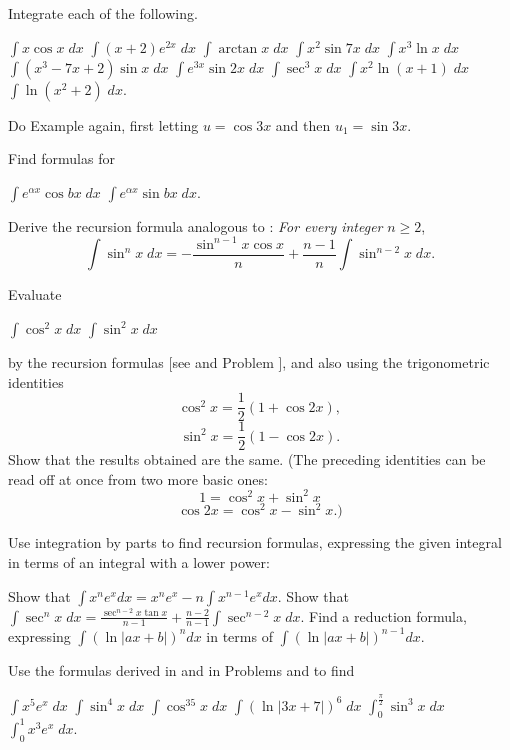 \begin{exercises}

Integrate each of the following.
\begin{exenum}
\x
$\int x \cos x \; dx$
\x
$\int (x+2) e^{2x} \; dx$
\x
$\int \arctan x \; dx$
\x
$\int x^2\sin 7x \; dx$
\x
$\int x^3 \ln x \; dx$
\x
$\int (x^3-7x+2) \sin x \; dx$
\x
$\int e^{3x} \sin 2x \; dx$
\x
$\int \sec^3x \; dx$
\x
$\int x^2\ln(x+1) \; dx$
\x
$\int \ln(x^2+2) \; dx$.
\end{exenum}

Do Example  again,
first letting $u = \cos 3x$ and then
$u_1 = \sin 3x$.

Find formulas for
\begin{exenum}
\x
$\int e^{\alpha x} \cos bx \; dx$
\x
$\int e^{\alpha x} \sin bx \; dx$.
\end{exenum}

Derive the recursion formula analogous to
: \emph{For every integer} $n \geq 2$,
\[
\int \sin^nx \; dx =
-\frac{\sin^{n-1}x \cos x}n + \frac{n-1}n
\int \sin^{n-2} x \; dx
.
\]

Evaluate
\begin{exenum}
\x
$\int \cos^2x \; dx$
\x
$\int \sin^2x \; dx$
\end{exenum}
by the recursion formulas
[see  and Problem ],
and also using the trigonometric identities
\[
\cos^2x = \frac12 (1+\cos2x)
,
\]
\[
\sin^2x = \frac12 (1-\cos2x)
.
\]
Show that the results obtained are the same.
(The preceding identities can be read off
at once from two more basic ones:
\[
1 = \cos^2x + \sin^2x
\]
\[
\cos 2x = \cos^2x - \sin^2x
.)
\]

Use integration by parts to find recursion formulas,
expressing the given integral in terms of an integral
with a lower power:
\begin{exenum}
\x
Show that
$\int x^ne^xdx = x^ne^x - n\int x^{n-1}e^xdx$.
\x
Show that
$\int \sec^nx \; dx =
\frac{\sec^{n-2}x \tan x}{n-1} +
\frac{n-2}{n-1} \int \sec^{n-2} x \; dx$.
\x
Find a reduction formula, expressing
$\int(\ln |ax + b|)^n dx$ in terms of
$\int(\ln|ax + b|)^{n-1}dx$.
\end{exenum}

Use the formulas derived in 
and in Problems  and  to find
\begin{exenum}
\x
$\int x^5e^x \; dx$
\x
$\int \sin^4x \; dx$
\x
$\int \cos^35x\; dx$
\x
$\int(\ln|3x+7|)^6 \; dx$
\x
$\int_0^{\frac{\pi}2} \sin^3x \; dx$
\x
$\int_0^1 x^3e^x \; dx$.
\end{exenum}

\end{exercises}
